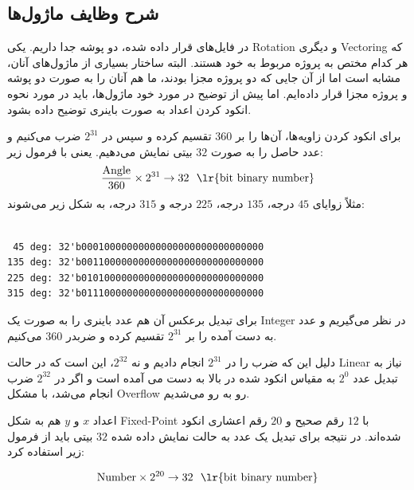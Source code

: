 \documentclass[12pt,titlepage,a4page , tikz , multi,table , svgnames,xcdraw]{article}
\begin{document}
\begin{landscape}
\thispagestyle{empty}


\end{landscape}


\subsection{شرح وظایف ماژول‌ها}

در فایل‌های قرار داده شده، دو پوشه جدا داریم. یکی Rotation و دیگری Vectoring که هر کدام مختص به پروژه مربوط به خود هستند. البته ساختار بسیاری از ماژول‌های آنان، مشابه است اما از آن جایی که دو پروژه مجزا بودند، ما هم آنان را به صورت دو پوشه و پروژه مجزا قرار داده‌ایم. اما پیش از توضیح در مورد خود ماژول‌ها، باید در مورد نحوه انکود کردن اعداد به صورت باینری توضیح داده بشود.

برای انکود کردن زاویه‌ها، آن‌ها را بر $360$ تقسیم کرده و سپس در $2^{31}$ ضرب می‌کنیم و عدد حاصل را به صورت $32$ بیتی نمایش می‌دهیم. یعنی با فرمول زیر:
$$\frac{\text{Angle}}{360} \times 2^{31} \rightarrow 32 ~~\text{\lr{bit binary number}}$$
 مثلاً زوایای $45$ درجه، $135$ درجه، $225$ درجه و $315$ درجه، به شکل زیر می‌شوند:

\begin{latin}
\begin{verbatim}

 45 deg: 32'b00010000000000000000000000000000
135 deg: 32'b00110000000000000000000000000000
225 deg: 32'b01010000000000000000000000000000
315 deg: 32'b01110000000000000000000000000000

\end{verbatim}
\end{latin} 

برای تبدیل برعکس آن هم عدد باینری را به صورت یک Integer در نظر می‌گیریم و عدد به دست آمده را بر $2^{31}$ تقسیم کرده و ضربدر $360$ می‌کنیم.


دلیل این که ضرب را در $2^{31}$ انجام دادیم و نه $2^{32}$، این است که در حالت Linear نیاز به  تبدیل عدد $2^{0}$ به مقیاس انکود شده در بالا به دست می آمده است و اگر در $2^{32}$ ضرب انجام می‌شد، با مشکل Overflow رو به رو می‌شدیم.

اعداد $x$ و $y$ هم به شکل Fixed-Point با $12$ رقم صحیح و $20$ رقم اعشاری انکود شده‌اند. در نتیجه برای تبدیل یک عدد به حالت نمایش داده شده $32$ بیتی باید از فرمول زیر استفاده کرد:

$$\text{Number} \times 2^{20} \rightarrow 32 ~~\text{\lr{bit binary number}}$$
\end{document}
